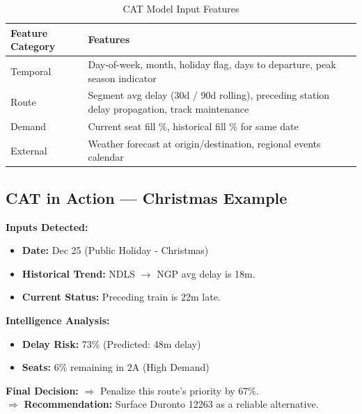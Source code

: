 \documentclass[12pt,a4paper]{report}
\begin{document}
\begin{table}[h!]
\centering
\caption{CAT Model Input Features}
\begin{tabularx}{\textwidth}{lX}
\toprule
\textbf{Feature Category} & \textbf{Features} \\
\midrule
Temporal & Day-of-week, month, holiday flag, days to departure, peak season indicator \\
Route & Segment avg delay (30d / 90d rolling), preceding station delay propagation, track maintenance \\
Demand & Current seat fill \%, historical fill \% for same date \\
External & Weather forecast at origin/destination, regional events calendar \\
\bottomrule
\end{tabularx}
\end{table}

\subsection*{CAT in Action --- Christmas Example}

\begin{tcolorbox}[enhanced, colback=codebg, colframe=primary, title=CAT Engine Decision: Rajdhani 12952 (Dec 25), coltitle=white, fonttitle=\bfseries]
\small\color{codetext}
\textbf{Inputs Detected:}
\begin{itemize}[leftmargin=1.5em, nosep]
  \item \textbf{Date:} Dec 25 (Public Holiday - Christmas)
  \item \textbf{Historical Trend:} NDLS $\to$ NGP avg delay is 18m.
  \item \textbf{Current Status:} Preceding train is 22m late.
\end{itemize}

\tcbline
\textbf{Intelligence Analysis:}
\begin{itemize}[leftmargin=1.5em, nosep]
  \item \textbf{Delay Risk:} 73\% (Predicted: 48m delay)
  \item \textbf{Seats:} 6\% remaining in 2A (High Demand)
\end{itemize}

\tcbline
\textbf{Final Decision:}
$\Rightarrow$ Penalize this route's priority by 67\%. \\
$\Rightarrow$ \textbf{Recommendation:} Surface Duronto 12263 as a reliable alternative.
\end{tcolorbox}
\end{document}
